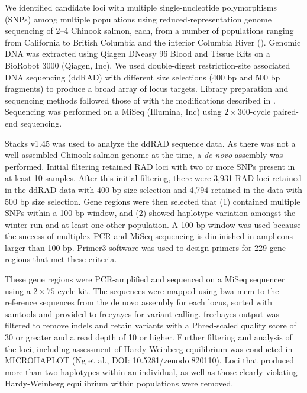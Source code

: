 We identified candidate loci with multiple single-nucleotide polymorphisms (SNPs) among multiple
populations using reduced-representation genome sequencing of 2--4 Chinook salmon, each, from a number of
populations ranging from California to British
Columbia and the interior Columbia River ().
Genomic DNA was extracted using Qiagen DNeasy 96 Blood and Tissue Kits on a BioRobot 3000
(Qiagen, Inc). We used double-digest restriction-site associated DNA sequencing (ddRAD) with different size selections (400 bp and 500 bp
fragments) to produce a broad array of locus targets. Library preparation and sequencing methods followed those of
\citet{peterson2012double} with the modifications described in \citep{baetscher2018microhaplotypes}.
Sequencing was performed on a MiSeq (Illumina, Inc) using $2 \times 300$-cycle paired-end sequencing.

Stacks v1.45 \cite{catchen2013stacks} was used to analyze the ddRAD sequence data.  As there was not a well-assembled Chinook salmon genome
at the time, a {\em de novo} assembly was performed.  Initial filtering retained RAD loci with two or more SNPs present
in at least 10 samples. After this initial filtering, there were 3,931 RAD loci retained in the ddRAD data with 400 bp size selection and
4,794 retained in the data with 500 bp size selection.
Gene regions were then selected that (1) contained multiple SNPs within a 100 bp window, and (2) showed haplotype variation amongst the winter run and at least one other population.
A 100 bp window was used because the success of multiplex PCR and MiSeq sequencing is diminished in amplicons larger than 100 bp. Primer3
software \citep{untergasser2012primer3} was used to design primers for 229 gene regions that met these criteria.

These gene regions were PCR-amplified and sequenced on a MiSeq sequencer using a $2\times 75$-cycle kit.
The sequences were mapped using
bwa-mem \citep{bwa-mem2009} to the reference sequences
from the de novo assembly for each locus, sorted with samtools \citep{li2009sequence} and provided to
freeyayes \citep{garrison2012haplotype} for variant calling.
freebayes output was filtered to remove indels and retain variants with a Phred-scaled quality score of 30
or greater and a read depth of 10 or higher. Further filtering and analysis of the loci, including
assessment of Hardy-Weinberg equilibrium \citep{hardy1908mendelian} was conducted in MICROHAPLOT (Ng et al., DOI: 10.5281/zenodo.820110).  Loci that produced more than two haplotypes within an individual, as well as those clearly violating Hardy-Weinberg equilibrium within populations were removed.



